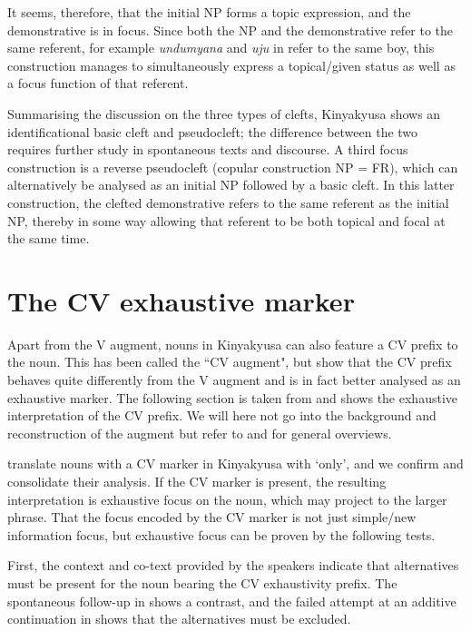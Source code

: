 \documentclass[output=paper]{langscibook}
\begin{document}
\z

It seems, therefore, that the initial NP forms a topic expression, and the demonstrative is in focus. Since both the NP and the demonstrative refer to the same referent, for example \textit{undumyana} and \textit{uju} in  refer to the same boy, this construction manages to simultaneously express a topical/given status as well as a focus function of that referent.

Summarising the discussion on the three types of clefts, Kinyakyusa shows an identificational basic cleft and pseudocleft; the difference between the two requires further study in spontaneous texts and discourse. A third focus construction is a reverse pseudocleft (copular construction NP = FR), which can alternatively be analysed as an initial NP followed by a basic cleft. In this latter construction, the clefted demonstrative refers to the same referent as the initial NP, thereby in some way allowing that referent to be both topical and focal at the same time.

\section{The CV exhaustive marker}
\label{bkm:Ref122533116}
Apart from the V augment, nouns in Kinyakyusa can also feature a CV prefix to the noun. This has been called the ``CV augment", but \citet{vanderWalLusekelo2022} show that the CV prefix behaves quite differently from the V augment and is in fact better analysed as an exhaustive marker. The following section is taken from \citet{vanderWalLusekelo2022} and shows the exhaustive interpretation of the CV prefix. We will here not go into the background and reconstruction of the augment but refer to \citet{VandeVelde2019} and \citet{HalpertFut} for general overviews.

\citet{MwangokaVoorhoeve1960} translate nouns with a CV marker in Kinyakyusa with ‘only’, and we confirm and consolidate their analysis. If the CV marker is present, the resulting interpretation is exhaustive focus on the noun, which may project to the larger phrase. That the focus encoded by the CV marker is not just simple/new information focus, but exhaustive focus can be proven by the following tests. 

  First, the context and co-text provided by the speakers indicate that alternatives must be present for the noun bearing the CV exhaustivity prefix. The spontaneous follow-up in  shows a contrast, and the failed attempt at an additive continuation in  shows that the alternatives must be excluded.
\end{document}
